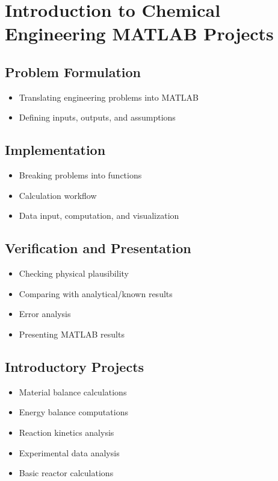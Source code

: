 \documentclass[11pt, a4paper]{article}
\begin{document}
\section{Introduction to Chemical Engineering MATLAB Projects}

\subsection{Problem Formulation}
\begin{itemize}
  \item Translating engineering problems into MATLAB
  \item Defining inputs, outputs, and assumptions
\end{itemize}

\subsection{Implementation}
\begin{itemize}
  \item Breaking problems into functions
  \item Calculation workflow
  \item Data input, computation, and visualization
\end{itemize}

\subsection{Verification and Presentation}
\begin{itemize}
  \item Checking physical plausibility
  \item Comparing with analytical/known results
  \item Error analysis
  \item Presenting MATLAB results
\end{itemize}

\subsection{Introductory Projects}
\begin{itemize}
  \item Material balance calculations
  \item Energy balance computations
  \item Reaction kinetics analysis
  \item Experimental data analysis
  \item Basic reactor calculations
\end{itemize}

\end{document}
